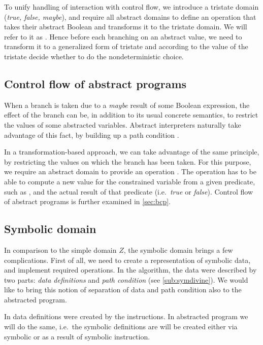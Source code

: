 To unify handling of interaction with control flow, we introduce a tristate
domain (\emph{true, false, maybe}), and require all abstract domains to define
an operation that takes their abstract Boolean and transforms it to the tristate
domain. We will refer to it as . Hence before each
branching on an abstract value, we need to transform it to a generalized form of
tristate and according to the value of the tristate decide whether to do the
nondeterministic choice.

\subsection{Control flow of abstract programs} \label{subsec:cf}
When a branch is taken due to a \emph{maybe} result of some Boolean expression,
the effect of the branch can be, in addition to its usual concrete semantics,
to restrict the values of some abstracted variables. Abstract interpreters
naturally take advantage of this fact, by building up a path condition
\cite{Rockai15}.

In a transformation-based approach, we can take advantage of the same principle, by
restricting the values on which the branch has been taken. For this purpose, we
require an abstract domain to provide an operation . The operation
 has to be able to compute a new value for the constrained
variable from a given \LLVM predicate, such as , and the actual result of
that predicate (i.e.~\emph{true} or \emph{false}). Control flow of abstract
programs is further examined in \autoref{sec:bcp}.

\subsection{Symbolic domain}\label{sec:sym}

In comparison to the simple domain $Z$, the symbolic domain brings a few
complications. First of all, we need to create a representation of symbolic
data, and implement required operations. In the \SymDIVINE algorithm, the data were
described by two parts: \emph{data definitions} and \emph{path condition} (see
\autoref{sub:symdivine}). We would like to bring this notion of separation of
data and path condition also to the abstracted program.

In \SymDIVINE data definitions were created by the instructions. In abstracted
program we will do the same, i.e.~the symbolic definitions are will be created either via symbolic
 or as a result of symbolic instruction.

